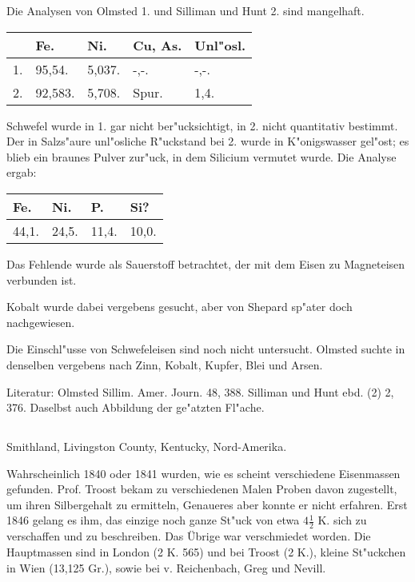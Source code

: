 \documentclass[a4paper, 11pt, oneside]{article}
\begin{document}
Die Analysen von Olmsted 1. und Silliman und Hunt 2. sind mangelhaft.
\begin{table}[H]
    \centering\swabfamily\Large
    \begin{tabular}{l l l l l}
         & Fe. & Ni. & Cu, As. & Unl"osl. \\ \hline
        1. & 95,54. & 5,037. & -,-. & -,-. \\
        2. & 92,583. & 5,708. & Spur. & 1,4. \\
    \end{tabular}
\end{table}

Schwefel wurde in 1. gar nicht ber"ucksichtigt, in 2. nicht quantitativ bestimmt. Der in Salzs"aure unl"osliche R"uckstand bei 2. wurde in K"onigswasser gel"ost; es blieb ein braunes Pulver zur"uck, in dem Silicium vermutet wurde. Die Analyse ergab:
\begin{table}[H]
    \centering\swabfamily\Large
    \begin{tabular}{l l l l}
        Fe. & Ni. & P. & Si? \\ \hline
        44,1. & 24,5. & 11,4. & 10,0. \\
    \end{tabular}
\end{table}

Das Fehlende wurde als Sauerstoff betrachtet, der mit dem Eisen zu Magneteisen verbunden ist.

Kobalt wurde dabei vergebens gesucht, aber von Shepard sp"ater doch nachgewiesen.

Die Einschl"usse von Schwefeleisen sind noch nicht untersucht. Olmsted suchte in denselben vergebens nach Zinn, Kobalt, Kupfer, Blei und Arsen.

\normalsize
Literatur: Olmsted Sillim. Amer. Journ. 48, 388. Silliman und Hunt ebd. (2) 2, 376. Daselbst auch Abbildung der ge"atzten Fl"ache.

\subsection{}
\LARGE
\paragraph{}
Smithland, Livingston County, Kentucky, Nord-Amerika.

Wahrscheinlich 1840 oder 1841 wurden, wie es scheint verschiedene Eisenmassen gefunden. Prof. Troost bekam zu verschiedenen Malen Proben davon zugestellt, um ihren Silbergehalt zu ermitteln, Genaueres aber konnte er nicht erfahren. Erst 1846 gelang es ihm, das einzige noch ganze St"uck von etwa $\mathfrak{4\frac{1}{2}}$ K. sich zu verschaffen und zu beschreiben. Das Übrige war verschmiedet worden. Die Hauptmassen sind in London (2 K. 565) und bei Troost (2 K.), kleine St"uckchen in Wien (13,125 Gr.), sowie bei v. Reichenbach, Greg und Nevill.
\end{document}
